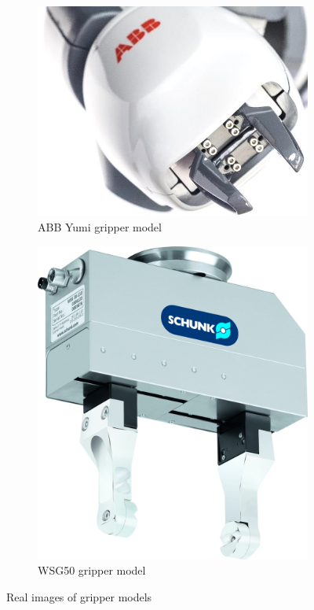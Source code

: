 \begin{figure}

    \begin{subfigure}{0.35\textwidth}
      \includegraphics[width=\linewidth]{figures/abbyumi.jpg}
      \caption{ABB Yumi gripper model} \label{fig:ABBYUMI}
    \end{subfigure}%
    \hspace*{\fill}   %
    \begin{subfigure}{0.35\textwidth}
      \includegraphics[width=\linewidth]{figures/wsg50.jpg}
      \caption{WSG50 gripper model} \label{fig:WSG50}
    \end{subfigure}%
    \hspace*{\fill}   %


\caption{ Real images of gripper models   \label{fig:robots}}
\end{figure}


